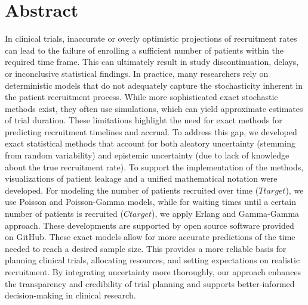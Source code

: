 \documentclass[11pt,a4paper,twoside]{book}
\begin{document}
\chapter*{Abstract}
\thispagestyle{plain}

\noindent
In clinical trials, inaccurate or overly optimistic projections of recruitment rates can lead to the failure of enrolling a sufficient number of patients within the required time frame. This can ultimately result in study discontinuation, delays, or inconclusive statistical findings. In practice, many researchers rely on deterministic models that do not adequately capture the stochasticity inherent in the patient recruitment process. While more sophisticated exact stochastic methods exist, they often use simulations, which can yield approximate estimates of trial duration. These limitations highlight the need for exact methods for predicting recruitment timelines and accrual. To address this gap, we developed exact statistical methods that account for both aleatory uncertainty (stemming from random variability) and epistemic uncertainty (due to lack of knowledge about the true recruitment rate). To support the implementation of the methods, visualizations of patient leakage and a unified mathematical notation were developed. For modeling the number of patients recruited over time  ($Ttarget$), we use Poisson and Poisson-Gamma models, while for waiting times until a certain number of patients is recruited ($Ctarget$), we apply Erlang and Gamma-Gamma approach. These developments are supported by open source software provided on GitHub. These exact models allow for more accurate predictions of the time needed to reach a desired sample size. This provides a more reliable basis for planning clinical trials, allocating resources, and setting expectations on realistic recruitment. By integrating uncertainty more thoroughly, our approach enhances the transparency and credibility of trial planning and supports better-informed decision-making in clinical research.

\vspace{2em}  %




\end{document}
